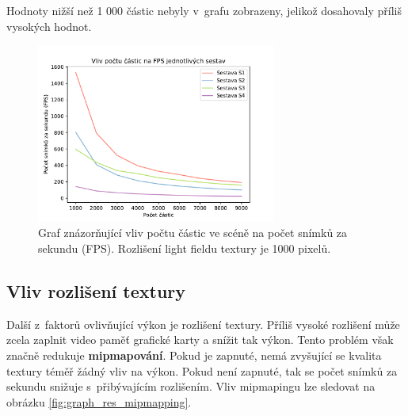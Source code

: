 Hodnoty nižší než 1 000 částic nebyly v~grafu zobrazeny, jelikož dosahovaly příliš vysokých hodnot. 
\begin{figure}[H]
	\centering
		\includegraphics[width=0.7\textwidth]{obrazky-figures/particle_count.pdf}
	\caption{Graf znázorňující vliv počtu částic ve scéně na počet snímků za sekundu (FPS). Rozlišení light fieldu textury je 1000 pixelů.}
	\label{fig:graph_particles}
\end{figure}

\subsection{Vliv rozlišení textury}
Další z~faktorů ovlivňující výkon je rozlišení textury. Příliš vysoké rozlišení může zcela zaplnit video paměť grafické karty a snížit tak výkon. Tento problém však značně redukuje \textbf{mipmapování}. Pokud je zapnuté, nemá zvyšující se kvalita textury téměř žádný vliv na výkon. Pokud není zapnuté, tak se počet snímků za sekundu snižuje s~přibývajícím rozlišením. Vliv mipmapingu lze sledovat na obrázku \ref{fig:graph_res_mipmapping}.


